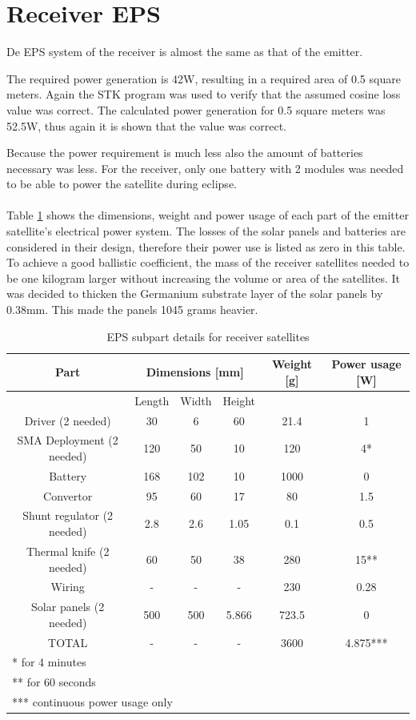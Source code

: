 \section{Receiver EPS}
\label{receiver_EPS}

De EPS system of the receiver is almost the same as that of the emitter.

The required power generation is 42W, resulting in a required area of 0.5 square meters. Again the STK program was used to verify that the assumed cosine loss value was correct. The calculated power generation for 0.5 square meters was 52.5W, thus again it is shown that the value was correct.

Because the power requirement is much less also the amount of batteries necessary was less. For the receiver, only one battery with 2 modules was needed to be able to power the satellite during eclipse.
\\\\
Table \ref{tab:EPS_detailsRec} shows the dimensions, weight and power usage of each part of the emitter satellite's electrical power system. The losses of the solar panels and batteries are considered in their design, therefore their power use is listed as zero in this table. To achieve a good ballistic coefficient, the mass of the receiver satellites needed to be one kilogram larger without increasing the volume or area of the satellites. It was decided to thicken the Germanium substrate layer of the solar panels by 0.38mm. This made the panels 1045 grams heavier.

\begin{table}[H!]
\centering
\begin{tabular}{cccccc}
\toprule
Part & \multicolumn{3}{c}{Dimensions [mm]} & Weight [g] & Power usage [W]\\ 
\midrule
 & Length & Width & Height & & \\ 
 Driver (2 needed) & 30 & 6 & 60 & 21.4 & 1 \\ 
 SMA Deployment (2 needed) & 120 & 50 & 10 & 120 & 4* \\ 
 Battery & 168 & 102 & 10 & 1000 & 0 \\ 
 Convertor & 95 & 60 & 17 & 80 & 1.5 \\ 
 Shunt regulator  (2 needed) & 2.8 & 2.6 & 1.05 & 0.1 & 0.5 \\ 
 Thermal knife (2 needed) & 60 & 50 & 38 & 280 & 15**  \\
 Wiring & - & - & - & 230 & 0.28 \\ 
 Solar panels (2 needed) & 500 & 500 & 5.866 & 723.5 & 0 \\
 \midrule
 TOTAL & - & - & - & 3600 & 4.875***  \\ 
\bottomrule
 \multicolumn{6}{l}{* for 4 minutes} \\
 \multicolumn{6}{l}{** for 60 seconds} \\
 \multicolumn{6}{l}{*** continuous power usage only} \\
\end{tabular}
\caption{EPS subpart details for receiver satellites}
\label{tab:EPS_detailsRec}
\end{table}


